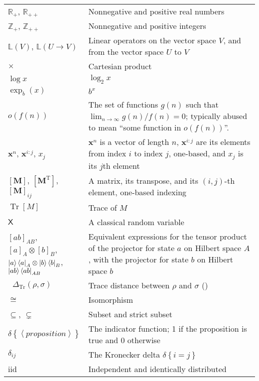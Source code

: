\documentclass[10pt, a4paper]{article}
\numberwithin{equation}{section} %
\theoremstyle{definition}
\theoremstyle{plain}
\newcommand{\?}{\mathrel{?}} %
\newcommand{\Z}{\mathbb{Z}} %
\newcommand{\R}{\mathbb{R}} %
\newcommand{\Lin}[1]{\mathbb{L}\left(#1\right)}
\newcommand{\tpose}{\mathrm{T}}
\newcommand{\cvec}[1]{\boldsymbol{\mathbf{#1}}}    %
\newcommand{\matr}[2][]{\left[\mathbf{#2}#1\right]} %
\newcommand{\angleb}[1]{\left\langle #1 \right\rangle} %
\newcommand{\indic}[1]{\delta{\left\{#1\right\}}} %
\newcommand{\Tr}[2][]{\mathop{\mathrm{Tr}#1}\left[ #2 \right]} %
\newcommand{\Trdist}[2]{\mathop{}\Delta_\mathrm{Tr}\left(#1, #2\right)}
\newcommand{\crv}[1]{\mathsf{#1}}
\newcommand{\proj}[2][]{{[#2]}_{#1}}
\begin{document}
    \begin{center}
      \begin{longtable*}{p{0.2\linewidth}|p{0.8\linewidth}}
        \(\R_+\), \(\R_{++}\) & Nonnegative and positive real numbers \\
        \(\Z_+\), \(\Z_{++}\) & Nonnegative and positive integers \\
        \(\Lin{V}\), \(\Lin{U\to V}\) & Linear operators on the vector space \(V\), and from the vector space \(U\) to \(V\) \\
        \(\times\) & Cartesian product \\
        \(\log x\) & \(\log_2 x\) \\
        \(\exp_b(x)\) & \(b^x\) \\
        \(o(f(n))\) & The set of functions \(g(n)\) such that \(\lim_{n\to\infty} g(n)/f(n) = 0\); typically abused to mean ``some function in \(o(f(n))\)''. \\
        \(\cvec{x}^n\), \(\cvec{x}^{i:j}\), \(x_j\) & \(\cvec{x}^n\) is a vector of length \(n\), \(\cvec{x}^{i:j}\) are its elements from index \(i\) to index \(j\), one-based, and \(x_j\) is its \(j\)th element \\
        \(\matr{M}\), \(\matr[^{\tpose}]{M}\), \(\matr{M}_{ij}\) & A matrix, its transpose, and its \((i,j)\)-th element, one-based indexing \\
        \(\Tr{M}\) & Trace of \(M\) \\
        \(\crv{X}\) & A classical random variable \\
        \(\proj[AB]{ab}\), \(\proj[A]{a} \otimes \proj[B]{b}\), \({\ket{a}\bra{a}}_A \otimes {\ket{b}\bra{b}}_B\), \({\ket{ab}\bra{ab}}_{AB}\) & Equivalent expressions for the tensor product of the projector for state \(a\) on Hilbert space \(A\), with the projector for state \(b\) on Hilbert space \(b\) \\
        \(\Trdist{\rho}{\sigma}\) & Trace distance between \(\rho\) and \(\sigma\) () \\
        \(\cong\) & Isomorphism \\
        \(\subseteq\), \(\subsetneq\) & Subset and strict subset \\
        \(\indic{\angleb{proposition}}\) & The indicator function; 1 if the proposition is true and 0 otherwise \\
        \(\delta_{ij}\) & The Kronecker delta \(\indic{i = j}\) \\
        iid & Independent and identically distributed \\

\end{longtable*}
\end{center}
\end{document}
